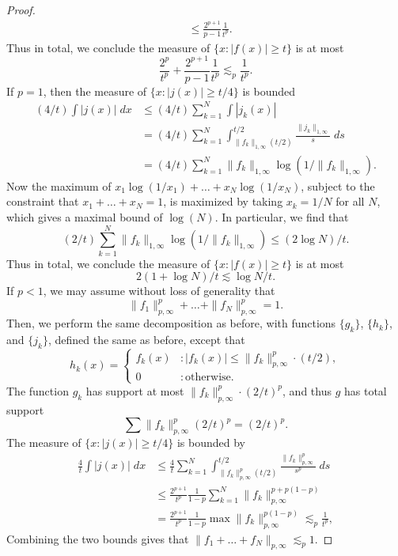\begin{proof}
\begin{align*}
        &\leq \frac{2^{p+1}}{p-1} \frac{1}{t^p}.
    \end{align*}
    Thus in total, we conclude the measure of $\{ x: |f(x)| \geq t \}$ is at most
    \[ \frac{2^p}{t^p} + \frac{2^{p+1}}{p - 1} \frac{1}{t^p} \lesssim_p \frac{1}{t^p}. \]
    If $p = 1$, then the measure of $\{ x : |j(x)| \geq t/4 \}$ is bounded
    \begin{align*}
        (4/t) \int |j(x)|\; dx &\leq (4/t) \sum_{k = 1}^N \int |j_k(x)|\\
        &= (4/t) \sum_{k = 1}^N \int_{\| f_k \|_{1,\infty} (t/2)}^{t/2} \frac{\| j_k \|_{1,\infty}}{s}\; ds\\
        &= (4/t) \sum_{k = 1}^N \| f_k \|_{1,\infty} \log(1/\| f_k \|_{1,\infty}).
    \end{align*}
    Now the maximum of $x_1 \log(1/x_1) + \dots + x_N \log(1/x_N)$, subject to the constraint that $x_1 + \dots + x_N = 1$, is maximized by taking $x_k = 1/N$ for all $N$, which gives a maximal bound of $\log(N)$. In particular, we find that
    \[ (2/t) \sum_{k = 1}^N \| f_k \|_{1,\infty} \log(1/\| f_k \|_{1,\infty}) \leq (2 \log N)/t. \]
    Thus in total, we conclude the measure of $\{ x: |f(x)| \geq t \}$ is at most
    \[ 2(1 + \log N)/t \lesssim \log N / t. \]
    If $p < 1$, we may assume without loss of generality that
    \[ \| f_1 \|_{p,\infty}^p + \dots + \| f_N \|_{p,\infty}^p = 1. \]
    Then, we perform the same decomposition as before, with functions $\{ g_k \}$, $\{ h_k \}$, and $\{ j_k \}$, defined the same as before, except that
    \[ h_k(x) = \begin{cases} f_k(x) &: |f_k(x)| \leq \| f_k \|_{p,\infty}^p \cdot (t/2), \\ 0 &: \text{otherwise}. \end{cases} \]
    The function $g_k$ has support at most $\| f_k \|_{p,\infty}^p \cdot (2/t)^p$, and thus $g$ has total support
    \[ \sum \| f_k \|_{p,\infty}^p (2/t)^p = (2/t)^p. \]
    The measure of $\{ x : |j(x)| \geq t/4 \}$ is bounded by
    \begin{align*}
      \frac{4}{t} \int |j(x)|\; dx &\leq \frac{4}{t} \sum_{k = 1}^N \int_{\| f_k \|_{p,\infty}^p (t/2)}^{t/2} \frac{\| f_k \|_{p,\infty}^p}{s^p}\; ds\\
      &\leq \frac{2^{p+1}}{t^p} \frac{1}{1 - p} \sum_{k = 1}^N \| f_k \|_{p,\infty}^{p + p(1-p)}\\
      &= \frac{2^{p+1}}{t^p} \frac{1}{1 - p} \max \| f_k \|_{p,\infty}^{p(1-p)} \lesssim_p \frac{1}{t^p},
    \end{align*}
    Combining the two bounds gives that $\| f_1 + \dots + f_N \|_{p,\infty} \lesssim_p 1$.
\end{proof}

